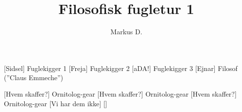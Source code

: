 \documentclass[a4paper,12pt]{article}
\title{Filosofisk fugletur 1}
\author{Markus D.}
\begin{document}
\maketitle




\begin{roles}
	[Sidsel] Fuglekigger 1
	[Freja] Fuglekigger 2
	[aDA!] Fuglekigger 3
	[Ejnar] Filosof (''Claus Emmeche'')
\end{roles}


\begin{props}
	[Hvem skaffer?] Ornitolog-gear
	[Hvem skaffer?] Ornitolog-gear
	[Hvem skaffer?] Ornitolog-gear
	 [Vi har dem ikke]
	
\end{props}
\end{document}
